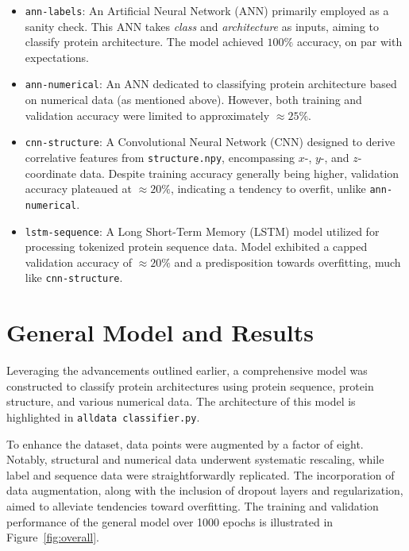 \documentclass[a4paper,12pt]{article}
\begin{document}
\begin{itemize}
\item \texttt{ann-labels}: An Artificial Neural Network (ANN) primarily employed as a sanity check. This ANN takes \textit{class} and \textit{architecture} as inputs, aiming to classify protein architecture. The model achieved $100\%$ accuracy, on par with expectations.
\item \texttt{ann-numerical}: An ANN dedicated to classifying protein architecture based on numerical data (as mentioned above). However, both training and validation accuracy were limited to approximately $\approx 25\%$.
\item \texttt{cnn-structure}: A Convolutional Neural Network (CNN) designed to derive correlative features from \texttt{structure.npy}, encompassing $x$-, $y$-, and $z$-coordinate data. Despite training accuracy generally being higher, validation accuracy plateaued at $\approx 20\%$, indicating a tendency to overfit, unlike \texttt{ann-numerical}.
\item \texttt{lstm-sequence}: A Long Short-Term Memory (LSTM) model utilized for processing tokenized protein sequence data. Model exhibited a capped validation accuracy of $\approx 20\%$ and a predisposition towards overfitting, much like \texttt{cnn-structure}.
\end{itemize}

\section{General Model and Results}
\label{sec:results}
Leveraging the advancements outlined earlier, a comprehensive model was constructed to classify protein architectures using protein sequence, protein structure, and various numerical data. The architecture of this model is highlighted in \texttt{all\textunderscore data \textunderscore classifier.py}. 


To enhance the dataset, data points were augmented by a factor of eight. Notably, structural and numerical data underwent systematic rescaling, while label and sequence data were straightforwardly replicated. The incorporation of data augmentation, along with the inclusion of dropout layers and regularization, aimed to alleviate tendencies toward overfitting. The training and validation performance of the general model over 1000 epochs is illustrated in Figure~\ref{fig:overall}.
\end{document}
